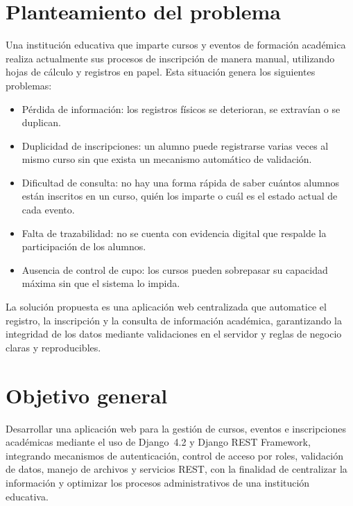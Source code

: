 \documentclass[11pt,letterpaper]{article}
\begin{document}
	\section{Planteamiento del problema}
	Una instituci\'on educativa que imparte cursos y eventos de formaci\'on acad\'emica realiza actualmente sus procesos de inscripci\'on de manera manual, utilizando hojas de c\'alculo y registros en papel. Esta situaci\'on genera los siguientes problemas:
	\begin{itemize}[leftmargin=*]
		\item P\'erdida de informaci\'on: los registros f\'isicos se deterioran, se extrav\'ian o se duplican.
		\item Duplicidad de inscripciones: un alumno puede registrarse varias veces al mismo curso sin que exista un mecanismo autom\'atico de validaci\'on.
		\item Dificultad de consulta: no hay una forma r\'apida de saber cu\'antos alumnos est\'an inscritos en un curso, qui\'en los imparte o cu\'al es el estado actual de cada evento.
		\item Falta de trazabilidad: no se cuenta con evidencia digital que respalde la participaci\'on de los alumnos.
		\item Ausencia de control de cupo: los cursos pueden sobrepasar su capacidad m\'axima sin que el sistema lo impida.
	\end{itemize}
	La soluci\'on propuesta es una aplicaci\'on web centralizada que automatice el registro, la inscripci\'on y la consulta de informaci\'on acad\'emica, garantizando la integridad de los datos mediante validaciones en el servidor y reglas de negocio claras y reproducibles.
	
	\section{Objetivo general}
	Desarrollar una aplicaci\'on web para la gesti\'on de cursos, eventos e inscripciones acad\'emicas mediante el uso de Django~4.2 y Django REST Framework, integrando mecanismos de autenticaci\'on, control de acceso por roles, validaci\'on de datos, manejo de archivos y servicios REST, con la finalidad de centralizar la informaci\'on y optimizar los procesos administrativos de una instituci\'on educativa.
	
\end{document}
